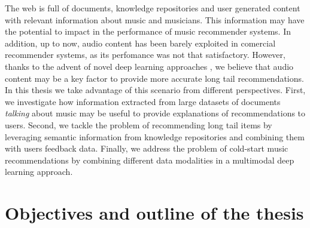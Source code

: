 


The web is full of documents, knowledge repositories and user generated content with relevant information about music and musicians. This information may have the potential to impact in the performance of music recommender systems. In addition, up to now, audio content has been barely exploited in comercial recommender systems, as its perfomance was not that satisfactory. However, thanks to the advent of novel deep learning approaches \cite{Oord2013}, we believe that audio content may be a key factor to provide more accurate long tail recommendations.
In this thesis we take advantage of this scenario from different perspectives. First, we investigate how information extracted from large datasets of documents \textit{talking} about music may be useful to provide explanations of recommendations to users. Second, we tackle the problem of recommending long tail items by leveraging semantic information from knowledge repositories and combining them with users feedback data. Finally, we address the problem of cold-start music recommendations by combining different data modalities in a multimodal deep learning approach.%


\section{Objectives and outline of the thesis}

